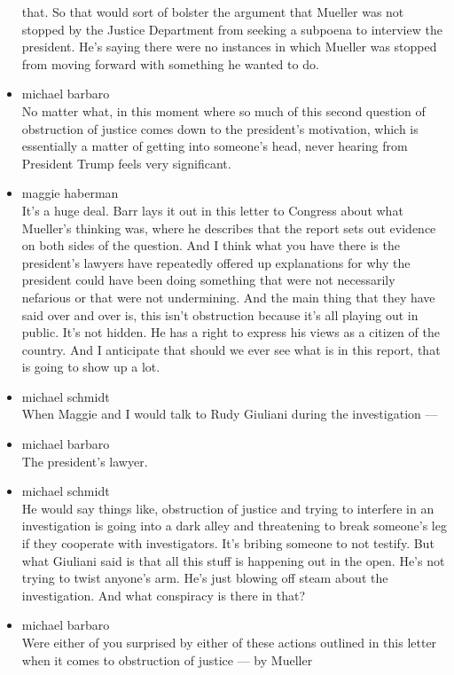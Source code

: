 \begin{itemize}
  that. So that would sort of bolster the argument that Mueller was not
  stopped by the Justice Department from seeking a subpoena to interview
  the president. He's saying there were no instances in which Mueller
  was stopped from moving forward with something he wanted to do.
\item
  michael barbaro\\
  No matter what, in this moment where so much of this second question
  of obstruction of justice comes down to the president's motivation,
  which is essentially a matter of getting into someone's head, never
  hearing from President Trump feels very significant.
\item
  maggie haberman\\
  It's a huge deal. Barr lays it out in this letter to Congress about
  what Mueller's thinking was, where he describes that the report sets
  out evidence on both sides of the question. And I think what you have
  there is the president's lawyers have repeatedly offered up
  explanations for why the president could have been doing something
  that were not necessarily nefarious or that were not undermining. And
  the main thing that they have said over and over is, this isn't
  obstruction because it's all playing out in public. It's not hidden.
  He has a right to express his views as a citizen of the country. And I
  anticipate that should we ever see what is in this report, that is
  going to show up a lot.
\item
  michael schmidt\\
  When Maggie and I would talk to Rudy Giuliani during the investigation
  ---
\item
  michael barbaro\\
  The president's lawyer.
\item
  michael schmidt\\
  He would say things like, obstruction of justice and trying to
  interfere in an investigation is going into a dark alley and
  threatening to break someone's leg if they cooperate with
  investigators. It's bribing someone to not testify. But what Giuliani
  said is that all this stuff is happening out in the open. He's not
  trying to twist anyone's arm. He's just blowing off steam about the
  investigation. And what conspiracy is there in that?
\item
  michael barbaro\\
  Were either of you surprised by either of these actions outlined in
  this letter when it comes to obstruction of justice --- by Mueller

\end{itemize}
